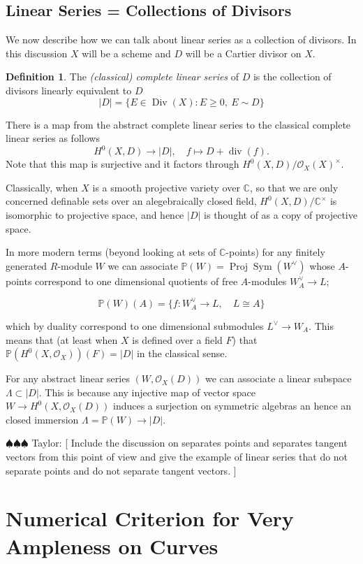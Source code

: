 \documentclass[12pt]{article}
\numberwithin{equation}{section}
\theoremstyle{definition}
\newtheorem{definition}[theorem]{Definition}
\theoremstyle{remark}
\newcommand{\CC}{\mathbb{C}}
\newcommand{\Ocal}{\mathcal{O}}
\newcommand{\PP}{\mathbb{P}}
\newcommand{\Proj}{\operatorname{Proj}}
\newcommand{\Div}{\operatorname{Div}}
\renewcommand{\div}{\operatorname{div}}
\newcommand{\Sym}{\operatorname{Sym}}
\newcommand{\taylor}[1]{{\color{blue} \sf $\spadesuit\spadesuit\spadesuit$ Taylor: [#1]}}
\begin{document}
\subsection{Linear Series = Collections of Divisors}

We now describe how we can talk about linear series as a collection of divisors.
In this discussion $X$ will be a scheme and $D$ will be a Cartier divisor on $X$.
\begin{definition}
The \emph{(classical) complete linear series} of $D$ is the collection of divisors linearly equivalent to $D$ 
 $$ \vert D \vert = \lbrace E \in \Div(X) \colon E \geq 0, \ E\sim D \rbrace $$
\end{definition}
There is a map from the abstract complete linear series to the classical complete linear series as follows
 $$ H^0(X,D) \to \vert D \vert , \quad f \mapsto D + \div(f). $$
Note that this map is surjective and it factors through $H^0(X,D)/\Ocal_X(X)^{\times}$.

Classically, when $X$ is a smooth projective variety over $\CC$, so that we are only concerned definable sets over an alegebraically closed field,  $H^0(X,D)/\CC^{\times}$ is isomorphic to projective space, and hence $\vert D \vert$ is thought of as a copy of projective space.

In more modern terms (beyond looking at sets of $\CC$-points) for any finitely generated $R$-module $W$ we can associate $\PP(W) = \Proj \Sym(W^{\vee})$ whose $A$-points correspond to one dimensional quotients of free $A$-modules $W^{\vee}_A \to L$; 

$$\PP(W)(A) = \lbrace f: W_A^{\vee} \to L, \quad L\cong A \rbrace $$

which by duality correspond to one dimensional submodules $L^{\vee} \to W_A$. 
This means that (at least when $X$ is defined over a field $F$) that $\PP(H^0(X,\Ocal_X))(F) = \vert D \vert$ in the classical sense.
 
For any abstract linear series $(W,\Ocal_X(D))$ we can associate a linear subspace $\Lambda \subset \vert D \vert$.
This is because any injective map of vector space $W \to H^0(X,\Ocal_X(D))$ induces a surjection on symmetric algebras an hence an closed immersion  $\Lambda = \PP(W) \to \vert D \vert $.

\taylor{
Include the discussion on separates points and separates tangent vectors from this point of view and give the example of linear series that do not separate points and do not separate tangent vectors.
}

\section{Numerical Criterion for Very Ampleness on Curves}
\end{document}

